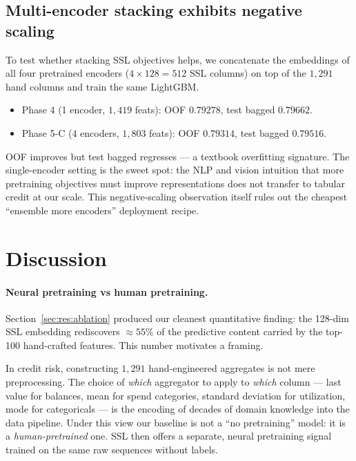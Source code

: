 \documentclass[sigconf, anonymous, review]{acmart}
\begin{document}
\subsection{Multi-encoder stacking exhibits negative scaling}
\label{sec:res:multienc}

To test whether stacking SSL objectives helps, we concatenate the
embeddings of all four pretrained encoders ($4 \times 128 = 512$ SSL
columns) on top of the $1{,}291$ hand columns and train the same
LightGBM.

\begin{itemize}
  \item Phase 4 (1 encoder, $1{,}419$ feats): OOF $0.79278$, test
        bagged $\mathbf{0.79662}$.
  \item Phase 5-C (4 encoders, $1{,}803$ feats): OOF
        $\mathbf{0.79314}$, test bagged $0.79516$.
\end{itemize}

OOF improves but test bagged regresses --- a textbook overfitting
signature. The single-encoder setting is the sweet spot: the NLP and
vision intuition that more pretraining objectives must improve
representations does not transfer to tabular credit at our scale.
This negative-scaling observation itself rules out the cheapest
``ensemble more encoders'' deployment recipe.

\section{Discussion}
\label{sec:discussion}

\paragraph{Neural pretraining vs human pretraining.}
Section~\ref{sec:res:ablation} produced our cleanest quantitative
finding: the 128-dim SSL embedding rediscovers $\approx 55\%$ of the
predictive content carried by the top-100 hand-crafted features.
This number motivates a framing.

In credit risk, constructing $1{,}291$ hand-engineered aggregates is
not mere preprocessing. The choice of \emph{which} aggregator to
apply to \emph{which} column --- last value for balances, mean for
spend categories, standard deviation for utilization, mode for
categoricals --- is the encoding of decades of domain knowledge into
the data pipeline. Under this view our baseline is not a ``no
pretraining'' model: it is a \emph{human-pretrained} one. SSL then
offers a separate, neural pretraining signal trained on the same
raw sequences without labels.
\end{document}
